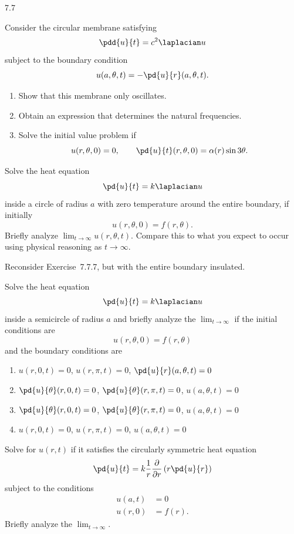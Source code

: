 \begin{exercises}{7.7}
\item Consider the circular membrane satisfying
\[
\pdd{u}{t} = c^2\laplacian u
\]
subject to the boundary condition
\[
u(a,\theta,t) = -\pd{u}{r}(a,\theta,t).
\]
\begin{enumerate}
\item[(a)] Show that this membrane only oscillates.
\item[(b)] Obtain an expression that determines the natural frequencies.
\item[(c)] Solve the initial value problem if
\[
u(r,\theta,0) = 0, \qquad \pd{u}{t}(r,\theta,0) = \alpha(r)\sin 3\theta.
\]
\end{enumerate}

\item Solve the heat equation
\[
\pd{u}{t} = k\laplacian u
\]
inside a circle of radius $a$ with zero temperature around the entire boundary, if initially
\[
u(r,\theta,0) = f(r,\theta).
\]
Briefly analyze $\lim_{t\to\infty}u(r,\theta,t)$.  Compare this to what you expect to occur using physical reasoning as $t \to \infty$.

\item[\starred] Reconsider Exercise~7.7.7, but with the entire boundary insulated.

\item Solve the heat equation
\[
\pd{u}{t} = k\laplacian u
\]
inside a semicircle of radius $a$ and briefly analyze the $\lim_{t\to\infty}$ if the initial conditions are
\[
u(r,\theta,0) = f(r,\theta)
\]
and the boundary conditions are

\begin{enumerate}
\item[(a)] $u(r,0,t) = 0$, \quad $u(r,\pi,t) = 0$, \quad $\pd{u}{r}(a,\theta,t) = 0$

\item[\starred(b)] $\pd{u}{\theta}(r,0,t) = 0$, \quad $\pd{u}{\theta}(r,\pi,t) = 0$, \quad $u(a,\theta,t) = 0$

\item[(c)] $\pd{u}{\theta}(r,0,t) = 0$, \quad $\pd{u}{\theta}(r,\pi,t) = 0$, \quad $u(a,\theta,t) = 0$

\item[(d)] $u(r,0,t) = 0$, \quad $u(r,\pi,t) = 0$, \quad $u(a,\theta,t) = 0$
\end{enumerate}

\item[\starred] Solve for $u(r,t)$ if it satisfies the circularly symmetric heat equation
\[
\pd{u}{t} = k\frac{1}{r}\frac{\partial}{\partial r}\left(r\pd{u}{r}\right)
\]
subject to the conditions
\[
\begin{aligned}
u(a,t) &= 0 \\
u(r,0) &= f(r).
\end{aligned}
\]
Briefly analyze the $\lim_{t\to\infty}$.


\end{exercises}
